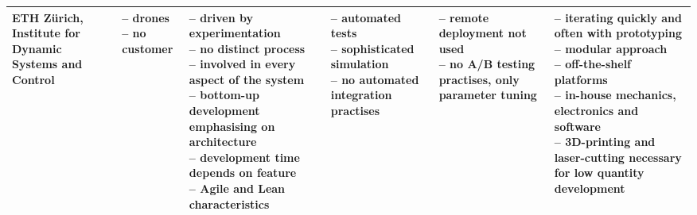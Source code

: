 \documentclass[english]{tktltiki2}
\begin{document}
\begin{landscape}
\begin{longtable}{|p{2.5cm}|p{1.5cm}|p{4cm}|p{4cm}|p{4cm}|p{4cm}|}
        ETH Zürich, Institute for Dynamic Systems and Control &
        \parbox[t]{1.5cm}{– drones \\
                          – no customer} &
        \parbox[t]{4cm}{– driven by experimentation \\
                        – no distinct process \\
                        – involved in every aspect of the system \\
                        – bottom-up development emphasising on architecture \\
                        – development time depends on feature \\
                        – Agile and Lean characteristics} &
        \parbox[t]{4cm}{– automated tests \\
                        – sophisticated simulation \\
                        – no automated integration practises} &
        \parbox[t]{4cm}{– remote deployment not used \\
                        – no A/B testing practises, only parameter tuning} &
        \parbox[t]{4cm}{– iterating quickly and often with prototyping \\
                        – modular approach \\
                        – off-the-shelf platforms \\
                        – in-house mechanics, electronics and software \\
                        – 3D-printing and laser-cutting necessary for low quantity development} \\

        \hline


\end{longtable}
\end{landscape}
\end{document}
